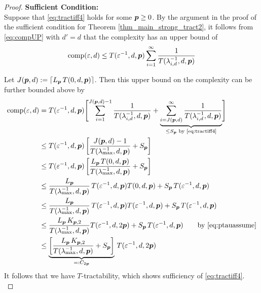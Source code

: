 \documentclass[11pt,a4paper]{article}
\begin{document}
\begin{proof}
    \textbf{Sufficient Condition:}\\
Suppose that \eqref{eq:tractiff4} holds for some $\boldsymbol{p} \ge 0$. By the argument in the proof of the sufficient condition for Theorem \ref{thm_main_strong_tract2}, it follows from \eqref{eq:compUP} with $d'=d$ that the complexity has an upper bound of
\begin{equation*}
	 \operatorname{comp}(\varepsilon,d) \le  T(\varepsilon^{-1},d,\boldsymbol{p}) \sum_{i=1}^\infty \frac{1}{T(\lambda_{i, d}^{-1},d,\boldsymbol{p})}
\end{equation*}

Let $J(\boldsymbol{p},d): = \lceil L_{\boldsymbol{p}}\, T(0,d,\boldsymbol{p})\rceil$.  Then this upper bound on the complexity can be further bounded above by
\begin{align*}
       \operatorname{comp}(\varepsilon,d)
       & = T(\varepsilon^{-1},d,\boldsymbol{p}) \Biggl [ \sum_{i=1}^{J(\boldsymbol{p},d) -1} \frac{1}{T(\lambda_{i, d}^{-1},d,\boldsymbol{p})}
       + \underbrace{\sum_{i=J(\boldsymbol{p},d)}^\infty \frac{1}{T(\lambda_{i, d}^{-1},d,\boldsymbol{p})}}_{\le S_{\boldsymbol{p}} \text{ by \eqref{eq:tractiff4}}} \Biggr ] \\
       & \le T(\varepsilon^{-1},d,\boldsymbol{p})\left[ \frac{J(\boldsymbol{p},d)-1}{T(\lambda_{\max}^{-1},d,\boldsymbol{p})} + S_{\boldsymbol{p}}\right]
        \\
       & \le T(\varepsilon^{-1},d,\boldsymbol{p})\left[\frac{L_{\boldsymbol{p}}\, T(0,d,\boldsymbol{p})}{T(\lambda_{\max}^{-1},d,\boldsymbol{p})} + S_{\boldsymbol{p}}\right] \\
       & \le\frac{L_{\boldsymbol{p}}}{T(\lambda_{\max}^{-1},d,\boldsymbol{p})} \,T(\varepsilon^{-1},d,\boldsymbol{p}) T(0,d,\boldsymbol{p}) + S_{\boldsymbol{p}}\, T(\varepsilon^{-1},d,\boldsymbol{p})\\
       & \le\frac{L_{\boldsymbol{p}}}{T(\lambda_{\max}^{-1},d,\boldsymbol{p})} \,T(\varepsilon^{-1},d,\boldsymbol{p}) T(\varepsilon^{-1},d,\boldsymbol{p}) + S_{\boldsymbol{p}}\, T(\varepsilon^{-1},d,\boldsymbol{p})\\
       & \le \frac{L_{\boldsymbol{p}}\,K_{\boldsymbol{p},2}}{T(\lambda_{\max}^{-1},d,\boldsymbol{p})}  T(\varepsilon^{-1},d,2\boldsymbol{p})  + S_{\boldsymbol{p}}\, T(\varepsilon^{-1},d,\boldsymbol{p})  \qquad \text{by \eqref{eq:ptauassume}}\\
       & \le \underbrace{\left[\frac{L_{\boldsymbol{p}}\,K_{\boldsymbol{p},2}}{T(\lambda_{\max}^{-1},d,\boldsymbol{p})} + S_{\boldsymbol{p}}\right]}_{=:C_{2\boldsymbol{p}}} \,T(\varepsilon^{-1},d,2\boldsymbol{p})
\end{align*}
It follows that we have $T$-tractability, which shows sufficiency of \eqref{eq:tractiff4}. \\




\end{proof}
\end{document}
